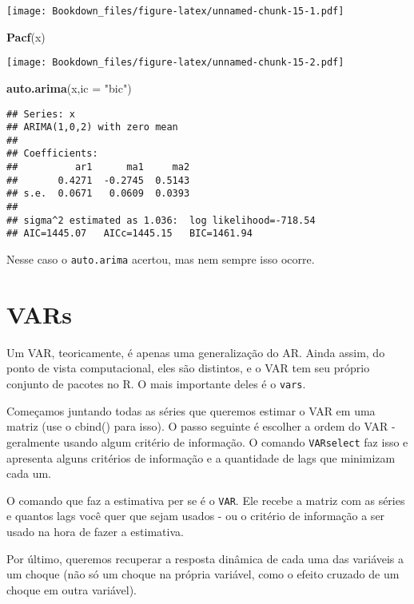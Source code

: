 \documentclass[]{book}
\newenvironment{Shaded}{\begin{snugshade}}{\end{snugshade}}
\newcommand{\KeywordTok}[1]{\textcolor[rgb]{0.13,0.29,0.53}{\textbf{#1}}}
\newcommand{\DataTypeTok}[1]{\textcolor[rgb]{0.13,0.29,0.53}{#1}}
\newcommand{\StringTok}[1]{\textcolor[rgb]{0.31,0.60,0.02}{#1}}
\newcommand{\NormalTok}[1]{#1}
\begin{document}
\texttt{[image: Bookdown\_files/figure-latex/unnamed-chunk-15-1.pdf]}

\begin{Shaded}
\begin{Highlighting}[]
\KeywordTok{Pacf}\NormalTok{(x)}
\end{Highlighting}
\end{Shaded}

\texttt{[image: Bookdown\_files/figure-latex/unnamed-chunk-15-2.pdf]}

\begin{Shaded}
\begin{Highlighting}[]
\KeywordTok{auto.arima}\NormalTok{(x,}\DataTypeTok{ic =} \StringTok{"bic"}\NormalTok{)}
\end{Highlighting}
\end{Shaded}

\begin{verbatim}
## Series: x 
## ARIMA(1,0,2) with zero mean 
## 
## Coefficients:
##          ar1      ma1     ma2
##       0.4271  -0.2745  0.5143
## s.e.  0.0671   0.0609  0.0393
## 
## sigma^2 estimated as 1.036:  log likelihood=-718.54
## AIC=1445.07   AICc=1445.15   BIC=1461.94
\end{verbatim}

Nesse caso o \texttt{auto.arima} acertou, mas nem sempre isso ocorre.

\section{VARs}\label{vars}

Um VAR, teoricamente, é apenas uma generalização do AR. Ainda assim, do
ponto de vista computacional, eles são distintos, e o VAR tem seu
próprio conjunto de pacotes no R. O mais importante deles é o
\texttt{vars}.

Começamos juntando todas as séries que queremos estimar o VAR em uma
matriz (use o cbind() para isso). O passo seguinte é escolher a ordem do
VAR - geralmente usando algum critério de informação. O comando
\texttt{VARselect} faz isso e apresenta alguns critérios de informação e
a quantidade de lags que minimizam cada um.

O comando que faz a estimativa per se é o \texttt{VAR}. Ele recebe a
matriz com as séries e quantos lags você quer que sejam usados - ou o
critério de informação a ser usado na hora de fazer a estimativa.

Por último, queremos recuperar a resposta dinâmica de cada uma das
variáveis a um choque (não só um choque na própria variável, como o
efeito cruzado de um choque em outra variável).
\end{document}
